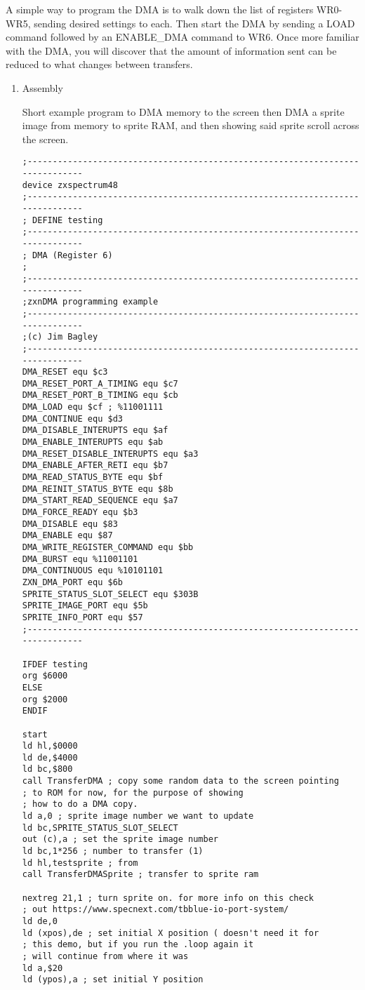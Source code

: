 A simple way to program the DMA is to walk down the list of registers
WR0-WR5, sending desired settings to each. Then start the DMA by
sending a LOAD command followed by an ENABLE\_DMA command to WR6. Once
more familiar with the DMA, you will discover that the amount of
information sent can be reduced to what changes between transfers.

\begin{enumerate}
\item Assembly

  Short example program to DMA memory to the screen then DMA a sprite
  image from memory to sprite RAM, and then showing said sprite scroll
  across the screen.
\begin{verbatim}
;------------------------------------------------------------------------------
device zxspectrum48
;------------------------------------------------------------------------------
; DEFINE testing
;------------------------------------------------------------------------------
; DMA (Register 6)
;
;------------------------------------------------------------------------------
;zxnDMA programming example
;------------------------------------------------------------------------------
;(c) Jim Bagley
;------------------------------------------------------------------------------
DMA_RESET equ $c3
DMA_RESET_PORT_A_TIMING equ $c7
DMA_RESET_PORT_B_TIMING equ $cb
DMA_LOAD equ $cf ; %11001111
DMA_CONTINUE equ $d3
DMA_DISABLE_INTERUPTS equ $af
DMA_ENABLE_INTERUPTS equ $ab
DMA_RESET_DISABLE_INTERUPTS equ $a3
DMA_ENABLE_AFTER_RETI equ $b7
DMA_READ_STATUS_BYTE equ $bf
DMA_REINIT_STATUS_BYTE equ $8b
DMA_START_READ_SEQUENCE equ $a7
DMA_FORCE_READY equ $b3
DMA_DISABLE equ $83
DMA_ENABLE equ $87
DMA_WRITE_REGISTER_COMMAND equ $bb
DMA_BURST equ %11001101
DMA_CONTINUOUS equ %10101101
ZXN_DMA_PORT equ $6b
SPRITE_STATUS_SLOT_SELECT equ $303B
SPRITE_IMAGE_PORT equ $5b
SPRITE_INFO_PORT equ $57
;------------------------------------------------------------------------------

IFDEF testing
org $6000
ELSE
org $2000
ENDIF

start
ld hl,$0000
ld de,$4000
ld bc,$800
call TransferDMA ; copy some random data to the screen pointing
; to ROM for now, for the purpose of showing
; how to do a DMA copy.
ld a,0 ; sprite image number we want to update
ld bc,SPRITE_STATUS_SLOT_SELECT
out (c),a ; set the sprite image number
ld bc,1*256 ; number to transfer (1)
ld hl,testsprite ; from
call TransferDMASprite ; transfer to sprite ram

nextreg 21,1 ; turn sprite on. for more info on this check
; out https://www.specnext.com/tbblue-io-port-system/
ld de,0
ld (xpos),de ; set initial X position ( doesn't need it for
; this demo, but if you run the .loop again it
; will continue from where it was
ld a,$20
ld (ypos),a ; set initial Y position


\end{verbatim}
\end{enumerate}
